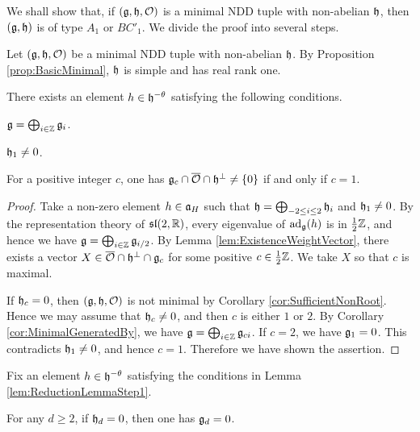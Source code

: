 We shall show that, if $(\mathfrak{g}, \mathfrak{h}, \mathcal{O})$ is a minimal NDD tuple with non-abelian $\mathfrak{h}$, then $(\mathfrak{g}, \mathfrak{h})$ is of type $A_1$ or $BC'_1$.
We divide the proof into several steps.

Let $(\mathfrak{g}, \mathfrak{h}, \mathcal{O})$ be a minimal NDD tuple with non-abelian $\mathfrak{h}$.
By Proposition \ref{prop:BasicMinimal}, $\mathfrak{h}$ is simple and has real rank one.

\begin{lemma} \label{lem:ReductionLemmaStep1}
	There exists an element $h \in \mathfrak{h}^{-\theta}$ satisfying the following conditions.
	\begin{enumparen}
		\item $\mathfrak{g} = \bigoplus_{i \in \mathbb{Z}} \mathfrak{g}_i$.
		\item $\mathfrak{h}_1 \neq 0$.
		\item For a positive integer $c$, one has $\mathfrak{g}_c\cap \overline{\mathcal{O}} \cap \mathfrak{h}^\perp \neq \left\{0 \right\}$ if and only if $c = 1$.
	\end{enumparen}
\end{lemma}

\begin{proof}
	Take a non-zero element $h \in \mathfrak{a}_H$ such that $\mathfrak{h} = \bigoplus_{-2\leq i \leq 2} \mathfrak{h}_i$ and $\mathfrak{h}_1 \neq 0$.
	By the representation theory of $\mathfrak{sl}(2,\mathbb{R})$, every eigenvalue of $\mathrm{ad}_{\mathfrak{g}}(h)$ is in $\frac{1}{2}\mathbb{Z}$,
	and hence we have $\mathfrak{g} = \bigoplus_{i \in \mathbb{Z}} \mathfrak{g}_{i/2}$.
	By Lemma \ref{lem:ExistenceWeightVector}, there exists a vector $X \in \overline{\mathcal{O}} \cap \mathfrak{h}^\perp \cap \mathfrak{g}_c$ for some positive $c \in \frac{1}{2}\mathbb{Z}$.
	We take $X$ so that $c$ is maximal.

	If $\mathfrak{h}_c = 0$, then $(\mathfrak{g}, \mathfrak{h}, \mathcal{O})$ is not minimal by Corollary \ref{cor:SufficientNonRoot}.
	Hence we may assume that $\mathfrak{h}_c \neq 0$, and then $c$ is either $1$ or $2$.
	By Corollary \ref{cor:MinimalGeneratedBy}, we have $\mathfrak{g} = \bigoplus_{i \in \mathbb{Z}} \mathfrak{g}_{ci}$.
	If $c = 2$, we have $\mathfrak{g}_1 = 0$.
	This contradicts $\mathfrak{h}_1 \neq 0$, and hence $c = 1$.
	Therefore we have shown the assertion.
\end{proof}

Fix an element $h \in \mathfrak{h}^{-\theta}$ satisfying the conditions in Lemma \ref{lem:ReductionLemmaStep1}.

\begin{lemma} \label{lem:ReductionLemmaStep2}
	For any $d \geq 2$, if $\mathfrak{h}_d = 0$, then one has $\mathfrak{g}_d = 0$.
\end{lemma}

